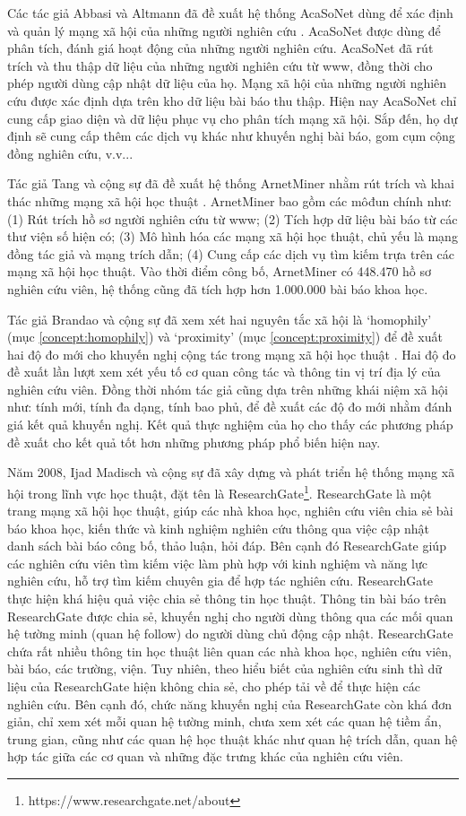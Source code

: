 Các tác giả Abbasi và Altmann đã đề xuất hệ thống AcaSoNet dùng để xác định và quản lý mạng xã hội của những người nghiên cứu \cite{Abbasi:2009:SocialNet}. AcaSoNet được dùng để phân tích, đánh giá hoạt động của những người nghiên cứu. AcaSoNet đã rút trích và thu thập dữ liệu của những người nghiên cứu từ www, đồng thời cho phép người dùng cập nhật dữ liệu của họ. Mạng xã hội của những người nghiên cứu được xác định dựa trên kho dữ liệu bài báo thu thập. Hiện nay AcaSoNet chỉ cung cấp giao diện và dữ liệu phục vụ cho phân tích mạng xã hội. Sắp đến, họ dự định sẽ cung cấp thêm các dịch vụ khác như khuyến nghị bài báo, gom cụm cộng đồng nghiên cứu, v.v...

Tác giả Tang và cộng sự đã đề xuất hệ thống ArnetMiner nhằm rút trích và khai thác những mạng xã hội học thuật \cite{Tang:2008:ArnetMinner}. ArnetMiner bao gồm các môđun chính như: (1) Rút trích hồ sơ người nghiên cứu từ www; (2) Tích hợp dữ liệu bài báo từ các thư viện số hiện có; (3) Mô hình hóa các mạng xã hội học thuật, chủ yếu là mạng đồng tác giả và mạng trích dẫn; (4) Cung cấp các dịch vụ tìm kiếm trựa trên các mạng xã hội học thuật. Vào thời điểm công bố, ArnetMiner có 448.470 hồ sơ nghiên cứu viên, hệ thống cũng đã tích hợp hơn 1.000.000 bài báo khoa học.

Tác giả Brandao và cộng sự đã xem xét hai nguyên tắc xã hội là `homophily' (mục \ref{concept:homophily}) và `proximity' (mục \ref{concept:proximity}) để đề xuất hai độ đo mới cho khuyến nghị cộng tác trong mạng xã hội học thuật \cite{Brandao:2013:ULS}. Hai độ đo đề xuất lần lượt xem xét yếu tố cơ quan công tác và thông tin vị trí địa lý của nghiên cứu viên. Đồng thời nhóm tác giả cũng dựa trên những khái niệm xã hội như: tính mới, tính đa dạng, tính bao phủ, để đề xuất các độ đo mới nhằm đánh giá kết quả khuyến nghị. Kết quả thực nghiệm của họ cho thấy các phương pháp đề xuất cho kết quả tốt hơn những phương pháp phổ biến hiện nay.

Năm 2008, Ijad Madisch và cộng sự đã xây dựng và phát triển hệ thống mạng xã hội trong lĩnh vực học thuật, đặt tên là ResearchGate\footnote{https://www.researchgate.net/about}. ResearchGate là một trang mạng xã hội học thuật, giúp các nhà khoa học, nghiên cứu viên chia sẻ bài báo khoa học, kiến thức và kinh nghiệm nghiên cứu thông qua việc cập nhật danh sách bài báo công bố, thảo luận, hỏi đáp. Bên cạnh đó ResearchGate giúp các nghiên cứu viên tìm kiếm việc làm phù hợp với kinh nghiệm và năng lực nghiên cứu, hỗ trợ tìm kiếm chuyên gia để hợp tác nghiên cứu. ResearchGate thực hiện khá hiệu quả việc chia sẻ thông tin học thuật. Thông tin bài báo trên ResearchGate được chia sẻ, khuyến nghị cho người dùng thông qua các mối quan hệ tường minh (quan hệ follow) do người dùng chủ động cập nhật. ResearchGate chứa rất nhiều thông tin học thuật liên quan các nhà khoa học, nghiên cứu viên, bài báo, các trường, viện. Tuy nhiên, theo hiểu biết của nghiên cứu sinh thì dữ liệu của ResearchGate hiện không chia sẻ, cho phép tải về để thực hiện các nghiên cứu. Bên cạnh đó, chức năng khuyến nghị của ResearchGate còn khá đơn giản, chỉ xem xét mỗi quan hệ tường minh, chưa xem xét các quan hệ tiềm ẩn, trung gian, cũng như các quan hệ học thuật khác như quan hệ trích dẫn, quan hệ hợp tác giữa các cơ quan và những đặc trưng khác của nghiên cứu viên. 

